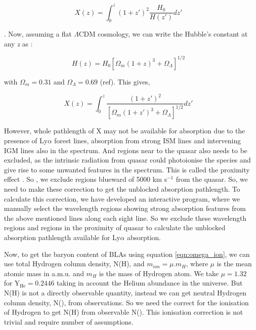 \begin{equation}
    X(z)=\int_0^z  (1+z')^2 \frac{H_0}{H(z')} dz'
\end{equation}

\citep{Bahcall-1969}. Now, assuming a flat $\Lambda \text{CDM}$ cosmology, we can write the Hubble's constant at any \emph{z} as :

\begin{equation}
    H(z) = H_0 \left[\Omega_m(1+z)^3+\Omega_\Lambda\right]^{1/2}
\end{equation}

with $\Omega_m=0.31$ and $\Omega_\Lambda=0.69$ (ref). This gives,

\begin{equation}
    X(z)=\int_0^z  \frac{(1+z')^2}{\left[\Omega_m(1+z')^3+\Omega_\Lambda\right]^{1/2}} dz'
\end{equation}

However, whole pathlength of X may not be available for absorption due to the presence of Ly$\alpha$ forest lines, absorption from strong ISM lines and intervening IGM lines also in the spectrum. And regions near to the quasar also needs to be excluded, as the intrinsic radiation from quasar could photoionise the species and give rise to some unwanted features in the spectrum. This is called the proximity effect \citep{Tripp-2008}. So , we exclude regions blueward of 5000 km s$^{-1}$ from the quasar. So, we need to make these correction to get the unblocked absorption pathlength. To calculate this correction, we have developed an interactive program, where we manually select the wavelength regions showing strong absorption features from the above mentioned lines along each sight line. So we exclude these wavelength regions and regions in the proximity of quasar to calculate the unblocked absorption pathlength available for Ly$\alpha$ absorption.

Now, to get the baryon content of BLAs using equation \ref{eqn:omega_ion}, we can use total Hydrogen column density, N(H), and $m_{ion}=\mu . m_H$, where $\mu$ is the mean atomic mass in a.m.u. and $m_H$ is the mass of Hydrogen atom. We take $\mu=1.32$ for $\text{Y}_\text{He}=0.2446$ \citep{Peimbert-2016} taking in account the Helium abundance in the universe. But N(H) is not a directly observable quantity, instead we can get neutral Hydrogen column density, N(), from observations. So we need the correct for the ionisation of Hydrogen to get N(H) from observable N(). This ionisation correction is not trivial and require number of assumptions.

